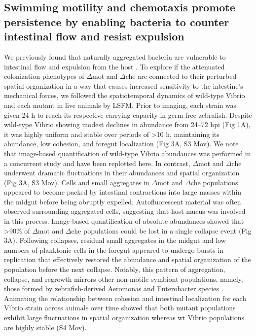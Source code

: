 \subsection{Swimming motility and chemotaxis promote persistence by enabling bacteria to counter intestinal flow and resist expulsion}
We previously found that naturally aggregated bacteria are vulnerable to intestinal flow and expulsion from the host \cite{wiles_host_2016,schlomann_sublethal_2019}. To explore if the attenuated colonization phenotypes of $\Delta$mot and $\Delta$che are connected to their perturbed spatial organization in a way that causes increased sensitivity to the intestine's mechanical forces, we followed the spatiotemporal dynamics of wild-type Vibrio and each mutant in live animals by LSFM. Prior to imaging, each strain was given 24 h to reach its respective carrying capacity in germ-free zebrafish. Despite wild-type Vibrio showing modest declines in abundance from 24–72 hpi (Fig 1A), it was highly uniform and stable over periods of >10 h, maintaining its abundance, low cohesion, and foregut localization (Fig 3A, S3 Mov). We note that image-based quantification of wild-type Vibrio abundances was performed in a concurrent study \cite{schlomann_sublethal_2019} and have been replotted here. In contrast, $\Delta$mot and $\Delta$che underwent dramatic fluctuations in their abundances and spatial organization (Fig 3A, S3 Mov). Cells and small aggregates in $\Delta$mot and $\Delta$che populations appeared to become packed by intestinal contractions into large masses within the midgut before being abruptly expelled. Autofluorescent material was often observed surrounding aggregated cells, suggesting that host mucus was involved in this process. Image-based quantification of absolute abundances showed that >90\% of $\Delta$mot and $\Delta$che populations could be lost in a single collapse event (Fig 3A). Following collapses, residual small aggregates in the midgut and low numbers of planktonic cells in the foregut appeared to undergo bursts in replication that effectively restored the abundance and spatial organization of the population before the next collapse. Notably, this pattern of aggregation, collapse, and regrowth mirrors other non-motile symbiont populations, namely, those formed by zebrafish-derived Aeromonas and Enterobacter species \cite{wiles_host_2016,schlomann_sublethal_2019}. Animating the relationship between cohesion and intestinal localization for each Vibrio strain across animals over time showed that both mutant populations exhibit large fluctuations in spatial organization whereas wt Vibrio populations are highly stable (S4 Mov).


